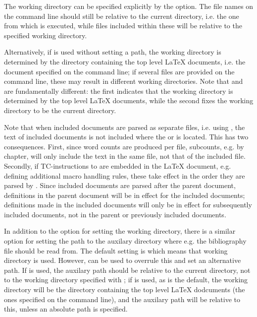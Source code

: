 \documentclass{article}
\begin{document}
The working directory can be specified explicitly by the  option. The file names on the command line should still be relative to the current directory, i.e. the one from which \TeXcount{} is executed, while files included within these will be relative to the specified working directory.

Alternatively, if  is used without setting a path, the working directory is determined by the directory containing the top level \LaTeX{} documents, i.e. the document specified on the command line; if several files are provided on the command line, these may result in different working directories. Note that  and  are fundamentally different: the first indicates that the working directory is determined by the top level \LaTeX{} documents, while the second fixes the working directory to be the current directory.

Note that when included documents are parsed as separate files, i.e. using , the text of included documents is not included where the  or  is located. This has two consequences. First, since word counts are produced per file, subcounts, e.g. by chapter, will only include the text in the same file, not that of the included file. Secondly, if TC-instructions to \TeXcount{} are embedded in the \LaTeX{} document, e.g. defining additional macro handling rules, these take effect in the order they are parsed by \TeXcount{}. Since included documents are parsed after the parent document, definitions in the parent document will be in effect for the included documents; definitions made in the included documents will only be in effect for subsequently included documents, not in the parent or previously included documents.

In addition to the  option for setting the working directory, there is a similar option  for setting the path to the auxilary directory where e.g. the bibliography  file should be read from. The default setting is  which means that working directory is used. However,  can be used to overrule this and set an alternative path. If  is used, the auxilary path should be relative to the current directory, not to the working directory specified with ; if  is used, as is the default, the working directory will be the directory containing the top level \LaTeX{} dodcuments (the ones specified on the command line), and the auxilary path will be relative to this, unless an absolute path is specified.
\end{document}
